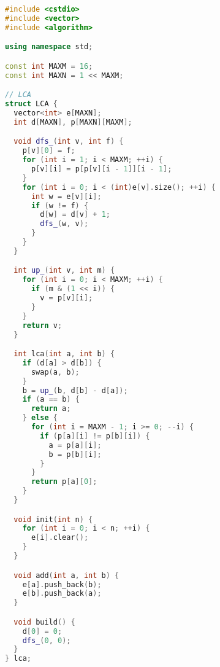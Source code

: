 \begin{lstlisting}[language=C++]
#include <cstdio>
#include <vector>
#include <algorithm>

using namespace std;

const int MAXM = 16;
const int MAXN = 1 << MAXM;

// LCA
struct LCA {
  vector<int> e[MAXN];
  int d[MAXN], p[MAXN][MAXM];

  void dfs_(int v, int f) {
    p[v][0] = f;
    for (int i = 1; i < MAXM; ++i) {
      p[v][i] = p[p[v][i - 1]][i - 1];
    }
    for (int i = 0; i < (int)e[v].size(); ++i) {
      int w = e[v][i];
      if (w != f) {
        d[w] = d[v] + 1;
        dfs_(w, v);
      }
    }
  }

  int up_(int v, int m) {
    for (int i = 0; i < MAXM; ++i) {
      if (m & (1 << i)) {
        v = p[v][i];
      }
    }
    return v;
  }

  int lca(int a, int b) {
    if (d[a] > d[b]) {
      swap(a, b);
    }
    b = up_(b, d[b] - d[a]);
    if (a == b) {
      return a;
    } else {
      for (int i = MAXM - 1; i >= 0; --i) {
        if (p[a][i] != p[b][i]) {
          a = p[a][i];
          b = p[b][i];
        }
      }
      return p[a][0];
    }
  }

  void init(int n) {
    for (int i = 0; i < n; ++i) {
      e[i].clear();
    }
  }

  void add(int a, int b) {
    e[a].push_back(b);
    e[b].push_back(a);
  }

  void build() {
    d[0] = 0;
    dfs_(0, 0);
  }
} lca;


\end{lstlisting}
